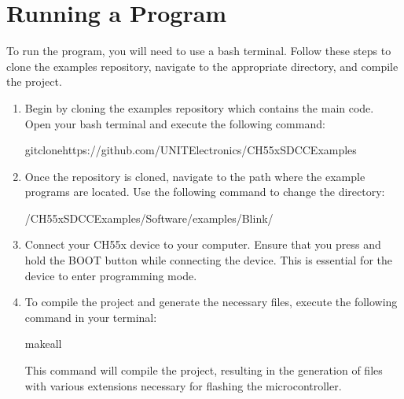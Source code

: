 \documentclass[letterpaper,10pt,english]{sphinxmanual}
\begin{document}
\section{Running a Program}
\label{\detokenize{compile:running-a-program}}
\sphinxAtStartPar
To run the program, you will need to use a bash terminal. Follow these steps to clone the examples repository, navigate to the appropriate directory, and compile the project.
\begin{enumerate}
%
\item {} 
\sphinxAtStartPar
{}

\sphinxAtStartPar
Begin by cloning the examples repository which contains the main code. Open your bash terminal and execute the following command:

\begin{sphinxVerbatim}[commandchars=\\\{\}]
gitclonehttps://github.com/UNIT\PYGZhy{}Electronics/CH55x\PYGZus{}SDCC\PYGZus{}Examples
\end{sphinxVerbatim}

\item {} 
\sphinxAtStartPar
{}

\sphinxAtStartPar
Once the repository is cloned, navigate to the path where the example programs are located. Use the following command to change the directory:

\begin{sphinxVerbatim}[commandchars=\\\{\}]
\PYGZti{}/CH55x\PYGZus{}SDCC\PYGZus{}Examples/Software/examples/Blink/
\end{sphinxVerbatim}

\item {} 
\sphinxAtStartPar
{}

\sphinxAtStartPar
Connect your CH55x device to your computer. Ensure that you press and hold the BOOT button while connecting the device. This is essential for the device to enter programming mode.

\item {} 
\sphinxAtStartPar
{}

\sphinxAtStartPar
To compile the project and generate the necessary files, execute the following command in your terminal:

\begin{sphinxVerbatim}[commandchars=\\\{\}]
makeall
\end{sphinxVerbatim}

\sphinxAtStartPar
This command will compile the project, resulting in the generation of files with various extensions necessary for flashing the microcontroller.

\end{enumerate}
\end{document}
